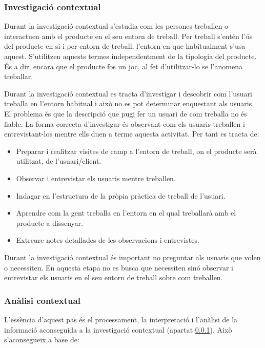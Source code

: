 \subsubsection{Investigació contextual}\label{subsec:investigacio_contextual}
Durant la investigació contextual s'estudia com les persones treballen o interactuen amb el producte en el seu entorn de treball. Per treball s'entén l'ús del producte en si i per entorn de treball, l'entorn en que habitualment s'usa aquest. S'utilitzen aquests termes independentment de la tipologia del producte. És a dir, encara que el producte fos un joc, al fet d'utilitzar-lo se l'anomena treballar. 

Durant la investigació contextual es tracta d'investigar i descobrir com l'usuari treballa en l'entorn habitual i això no es pot determinar enquestant als usuaris. El problema és que la descripció que pugi fer un usuari de com treballa no és fiable. La forma correcta d'investigar és observant com els usuaris treballen i entrevistant-los mentre ells duen a terme aquesta activitat. Per tant es tracta de:

\begin{itemize}
\item Preparar i realitzar visites de camp a l'entorn de treball, on el producte serà utilitzat, de l'usuari/client.
\item Observar i entrevistar els usuaris mentre treballen.
\item Indagar en l'estructura de la pròpia pràctica de treball de l'usuari.
\item Aprendre com la gent treballa en l'entorn en el qual treballarà amb el producte a dissenyar.
\item Extreure notes detallades de les observacions i entrevistes.
\end{itemize}

Durant la investigació contextual és important no preguntar als usuaris que volen o necessiten. En aquesta etapa no es busca que necessiten sinó observar i entrevistar els usuaris en el seu entorn de treball sobre com treballen.


\subsubsection{Anàlisi contextual}\label{subsec:analisi_contextual}
L'essència d'aquest pas és el processament, la interpretació i l'anàlisi de la informació aconseguida a la investigació contextual (apartat \ref{subsec:investigacio_contextual}). Això s'aconsegueix a base de:

